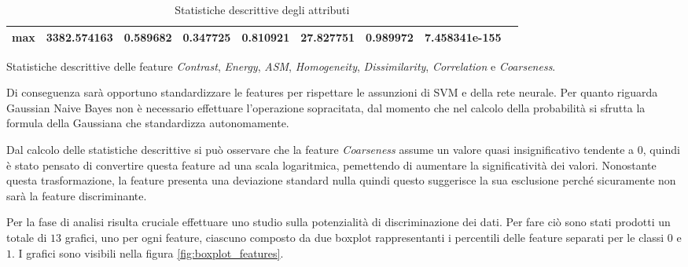 \begin{table}[h!]
\begin{subtable}[h]{1\textwidth}
{\begin{tabular}{c|c c c c c c c c}
                        \textbf{max}                                              & 3382.574163       & 0.589682        & 0.347725     & 0.810921             & 27.827751              & 0.989972             & 7.458341e-155       \\ \hline
                  \end{tabular}}
            \caption{Statistiche descrittive delle feature \textit{Contrast}, \textit{Energy}, \textit{ASM}, \textit{Homogeneity}, \textit{Dissimilarity}, \textit{Correlation} e \textit{Coarseness}.}
            \label{tab:secondameta}
      \end{subtable}
      \caption{Statistiche descrittive degli attributi}
      \label{tab:desc-stat}
\end{table}

Di conseguenza sarà opportuno standardizzare le features per rispettare le 
assunzioni di SVM e della rete neurale. Per quanto riguarda Gaussian Naive
Bayes non è necessario effettuare l'operazione sopracitata, dal momento che nel calcolo della 
probabilità si sfrutta la formula della Gaussiana che standardizza autonomamente.

Dal calcolo delle statistiche descrittive si può osservare che la feature \textit{Coarseness}
assume un valore quasi insignificativo tendente a $0$, quindi è stato pensato di convertire questa feature
ad una scala logaritmica, pemettendo di aumentare la significatività dei valori.
Nonostante questa trasformazione, la feature presenta una deviazione standard nulla 
quindi questo suggerisce la sua esclusione perché sicuramente non sarà la
feature discriminante.

Per la fase di analisi risulta cruciale effettuare uno studio sulla potenzialità 
di discriminazione dei dati. Per fare ciò sono stati prodotti un totale di $13$
grafici, uno per ogni feature, ciascuno composto da due boxplot rappresentanti
i percentili delle feature separati per le classi $0$ e $1$. I grafici sono visibili
nella figura \ref{fig:boxplot_features}.

\newpage

